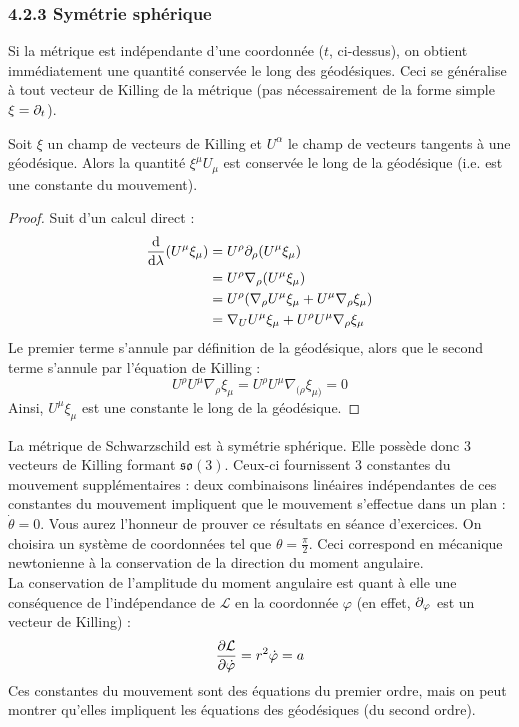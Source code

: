 \subsubsection{4.2.3 Symétrie sphérique}
Si la métrique est indépendante d'une coordonnée ($t$, ci-dessus), on obtient immédiatement une quantité conservée le long des géodésiques. Ceci se généralise à tout vecteur de Killing de la métrique (pas nécessairement de la forme simple $\xi = \partial_t$).
\begin{theoremframe}
    \begin{propri}
        Soit $\xi$ un champ de vecteurs de Killing et $U^\alpha$ le champ de vecteurs tangents à une géodésique. Alors la quantité $\xi^\mu U_\mu$ est conservée le long de la géodésique (i.e. est une constante du mouvement).
    \end{propri}
\end{theoremframe}
\begin{proof}
    Suit d'un calcul direct :
    \begin{align}
        \frac{\mathrm{d}}{ \mathrm{d} \lambda} (U^\mu \xi_\mu) &= U^\rho \partial_\rho (U^\mu \xi_\mu)\\
        &= U^\rho \nabla_\rho (U^\mu \xi_\mu)\\
        &= U^\rho (\nabla_\rho U^\mu \xi_\mu + U^\mu \nabla_\rho \xi_\mu) \\
        &=  \nabla_U U^\mu \xi_\mu + U^\rho U^\mu \nabla_\rho \xi_\mu
    \end{align}
    Le premier terme s'annule par définition de la géodésique, alors que le second terme s'annule par l'équation de Killing :
    \begin{equation}
        U^\rho U^\mu \nabla_\rho \xi_\mu = U^\rho U^\mu \nabla_{(\rho} \xi_{\mu)} = 0
    \end{equation}
    Ainsi, $U^\mu \xi_\mu$ est une constante le long de la géodésique.
\end{proof}
La métrique de Schwarzschild est à symétrie sphérique. Elle possède donc 3 vecteurs de Killing formant $\mathfrak{so}(3)$. Ceux-ci fournissent 3 constantes du mouvement supplémentaires : deux combinaisons linéaires indépendantes de ces constantes du mouvement impliquent que le mouvement s'effectue dans un plan : $\dot{\theta} = 0$. Vous aurez l'honneur de prouver ce résultats en séance d'exercices. On choisira un système de coordonnées tel que $\theta  = \frac{\pi}{2}$. Ceci correspond en mécanique newtonienne à la conservation de la direction du moment angulaire.\\
La conservation de l'amplitude du moment angulaire est quant à elle une conséquence de l'indépendance de $\mathcal{L}$ en la coordonnée $\varphi$ (en effet, $\partial_\varphi$ est un vecteur de Killing) :
\begin{equation}
    \frac{\partial \mathcal{L}}{\partial \dot{\varphi}} = r^2 \dot{\varphi} = a
\end{equation}
Ces constantes du mouvement sont des équations du premier ordre, mais on peut montrer qu'elles impliquent les équations des géodésiques (du second ordre).
